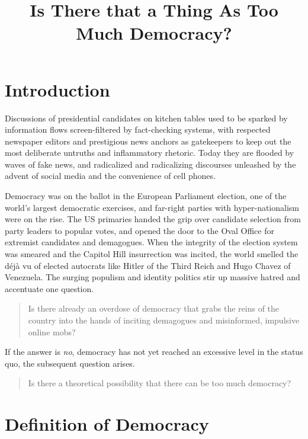 \documentclass{scrartcl}
\theoremstyle{definition}
\begin{document}
\title{Is There that a Thing As Too Much Democracy?}
\author{}
\date{}
\maketitle

\section{Introduction}

Discussions of presidential candidates on kitchen tables used to be sparked by information flows screen-filtered by fact-checking systems, with respected newspaper editors and prestigious news anchors as gatekeepers to keep out the most deliberate untruths and inflammatory rhetoric. Today they are flooded by waves of fake news, and radicalized and radicalizing discourses unleashed by the advent of social media and the convenience of cell phones. 

Democracy was on the ballot in the European Parliament election, one of the world’s largest democratic exercises, and far-right parties with hyper-nationalism were on the rise. The US primaries handed the grip over candidate selection from party leaders to popular votes, and opened the door to the Oval Office for extremist candidates and demagogues. When the integrity of the election system was smeared and the Capitol Hill insurrection was incited, the world smelled the déjà vu of elected autocrats like Hitler of the Third Reich and Hugo Chavez of Venezuela. The surging populism and identity politics stir up massive hatred and accentuate one question. 

\begin{quote}
Is there already an overdose of democracy that grabs the reins of the country into the hands of inciting demagogues and misinformed, impulsive online mobs? 
\end{quote}

If the answer is \emph{no}, democracy has not yet reached an excessive level in the status quo, the subsequent question arises.

\begin{quote}
Is there a theoretical possibility that there can be too much democracy? 
\end{quote}

\section{Definition of Democracy}
\end{document}
